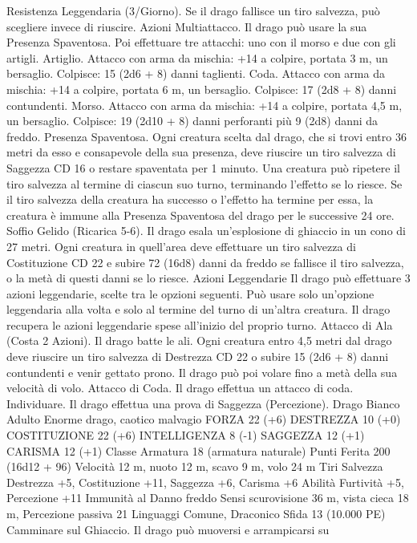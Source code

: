 \begin{multicols}{2}
Resistenza Leggendaria (3/Giorno). Se il drago fallisce un tiro
salvezza, può scegliere invece di riuscire.
Azioni
Multiattacco. Il drago può usare la sua Presenza Spaventosa. Poi
effettuare tre attacchi: uno con il morso e due con gli artigli.
Artiglio. Attacco con arma da mischia: +14 a colpire, portata 3
m, un bersaglio.
Colpisce: 15 (2d6 + 8) danni taglienti.
Coda. Attacco con arma da mischia: +14 a colpire, portata 6 m,
un bersaglio.
Colpisce: 17 (2d8 + 8) danni contundenti.
Morso. Attacco con arma da mischia: +14 a colpire, portata 4,5
m, un bersaglio.
Colpisce: 19 (2d10 + 8) danni perforanti più 9 (2d8) danni da freddo.
Presenza Spaventosa. Ogni creatura scelta dal drago, che si trovi
entro 36 metri da esso e consapevole della sua presenza, deve
riuscire un tiro salvezza di Saggezza CD 16 o restare spaventata per
1 minuto. Una creatura può ripetere il tiro salvezza al termine di
ciascun suo turno, terminando l’effetto se lo riesce. Se il tiro salvezza
della creatura ha successo o l’effetto ha termine per essa, la creatura è
immune alla Presenza Spaventosa del drago per le successive 24 ore.
Soffio Gelido (Ricarica 5-6). Il drago esala un’esplosione di ghiaccio
in un cono di 27 metri. Ogni creatura in quell’area deve effettuare un tiro
salvezza di Costituzione CD 22 e subire 72 (16d8) danni da freddo se
fallisce il tiro salvezza, o la metà di questi danni se lo riesce.
Azioni Leggendarie
Il drago può effettuare 3 azioni leggendarie, scelte tra le opzioni
seguenti. Può usare solo un’opzione leggendaria alla volta e solo
al termine del turno di un’altra creatura. Il drago recupera le
azioni leggendarie spese all’inizio del proprio turno.
Attacco di Ala (Costa 2 Azioni). Il drago batte le ali. Ogni creatura
entro 4,5 metri dal drago deve riuscire un tiro salvezza di Destrezza
CD 22 o subire 15 (2d6 + 8) danni contundenti e venir gettato prono.
Il drago può poi volare fino a metà della sua velocità di volo.
Attacco di Coda. Il drago effettua un attacco di coda.
Individuare. Il drago effettua una prova di Saggezza (Percezione).
Drago Bianco Adulto
Enorme drago, caotico malvagio
FORZA 22 (+6)
DESTREZZA 10 (+0)
COSTITUZIONE 22 (+6)
INTELLIGENZA 8 (-1)
SAGGEZZA 12 (+1)
CARISMA 12 (+1)
Classe Armatura 18 (armatura naturale)
Punti Ferita 200 (16d12 + 96)
Velocità 12 m, nuoto 12 m, scavo 9 m, volo 24 m
Tiri Salvezza Destrezza +5, Costituzione +11, Saggezza +6,
Carisma +6
Abilità Furtività +5, Percezione +11
Immunità al Danno freddo
Sensi scurovisione 36 m, vista cieca 18 m, Percezione passiva 21
Linguaggi Comune, Draconico
Sfida 13 (10.000 PE)
Camminare sul Ghiaccio. Il drago può muoversi e arrampicarsi su

\end{multicols}
